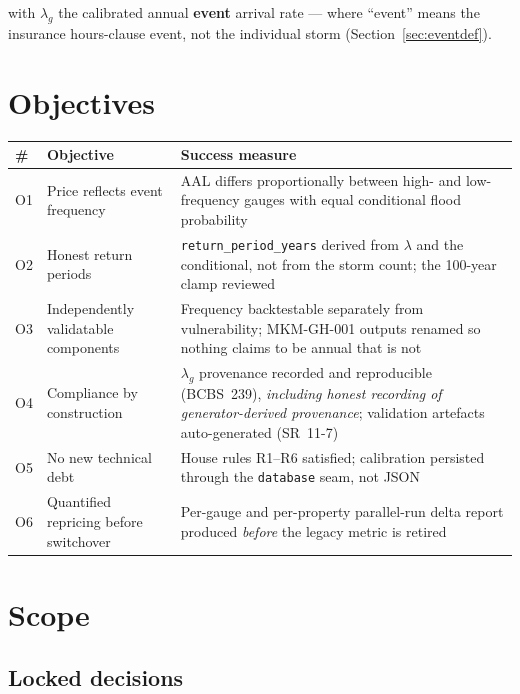 \documentclass[11pt]{article}
\begin{document}
\noindent with $\lambda_g$ the calibrated annual \textbf{event} arrival rate ---
where ``event'' means the insurance hours-clause event, not the individual
storm (Section~\ref{sec:eventdef}).

\section{Objectives}

\begin{longtable}{@{}p{}p{}p{}@{}}
\toprule
\textbf{\#} & \textbf{Objective} & \textbf{Success measure} \\
\midrule
\endhead
O1 & Price reflects event frequency & AAL differs proportionally between high-
and low-frequency gauges with equal conditional flood probability \\
O2 & Honest return periods & \texttt{return\_period\_years} derived from
$\lambda$ and the conditional, not from the storm count; the 100-year clamp
reviewed \\
O3 & Independently validatable components & Frequency backtestable separately
from vulnerability; MKM-GH-001 outputs renamed so nothing claims to be annual
that is not \\
O4 & Compliance by construction & $\lambda_g$ provenance recorded and
reproducible (BCBS~239), \emph{including honest recording of generator-derived
provenance}; validation artefacts auto-generated (SR~11-7) \\
O5 & No new technical debt & House rules R1--R6 satisfied; calibration persisted
through the \texttt{database} seam, not JSON \\
O6 & Quantified repricing before switchover & Per-gauge and per-property
parallel-run delta report produced \emph{before} the legacy metric is retired \\
\bottomrule
\end{longtable}

\section{Scope}

\subsection{Locked decisions}
\end{document}
